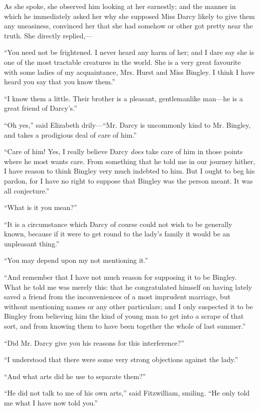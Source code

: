 As she spoke, she observed him looking at her earnestly; and the manner in which he immediately asked her why she supposed Miss Darcy likely to give them any uneasiness, convinced her that she had somehow or other got pretty near the truth. She directly replied,---

``You need not be frightened. I never heard any harm of her; and I dare say she is one of the most tractable creatures in the world. She is a very great favourite with some ladies of my acquaintance, Mrs. Hurst and Miss Bingley. I think I have heard you say that you know them.''

``I know them a little. Their brother is a pleasant, gentlemanlike man---he is a great friend of Darcy's.''

``Oh yes,'' said Elizabeth drily---``Mr. Darcy is uncommonly kind to Mr. Bingley, and takes a prodigious deal of care of him.''

``Care of him! Yes, I really believe Darcy \textit{does} take care of him in those points where he most wants care. From something that he told me in our journey hither, I have reason to think Bingley very much indebted to him. But I ought to beg his pardon, for I have no right to suppose that Bingley was the person meant. It was all conjecture.''

``What is it you mean?''

``It is a circumstance which Darcy of course could not wish to be generally known, because if it were to get round to the lady's family it would be an unpleasant thing.''

``You may depend upon my not mentioning it.''

``And remember that I have not much reason for supposing it to be Bingley. What he told me was merely this: that he congratulated himself on having lately saved a friend from the inconveniences of a most imprudent marriage, but without mentioning names or any other particulars; and I only suspected it to be Bingley from believing him the kind of young man to get into a scrape of that sort, and from knowing them to have been together the whole of last summer.''

``Did Mr. Darcy give you his reasons for this interference?''

``I understood that there were some very strong objections against the lady.''

``And what arts did he use to separate them?''

``He did not talk to me of his own arts,'' said Fitzwilliam, smiling. ``He only told me what I have now told you.''


